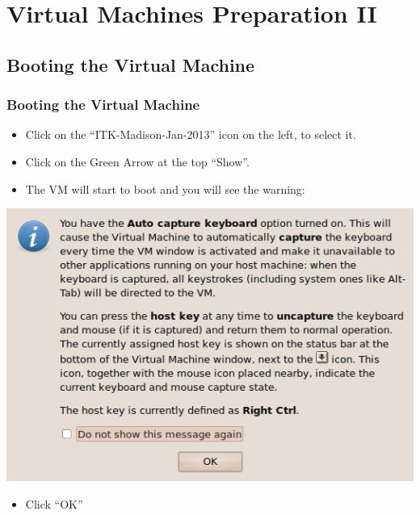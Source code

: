 \section{Virtual Machines Preparation II}


\subsection{Booting the Virtual Machine}
\begin{frame}
\frametitle{Booting the Virtual Machine}
\begin{itemize}
\item Click on the ``ITK-Madison-Jan-2013'' icon on the left, to select it.
\item Click on the Green Arrow at the top ``Show''.
\item The VM will start to boot and you will see the warning:
\end{itemize}
\begin{center}
  \includegraphics[width=0.4\paperwidth]{../Art/Screenshot-VirtualBox-OSE-02.png}
\end{center}
\begin{itemize}
\item Click ``OK''
\end{itemize}
\end{frame}

